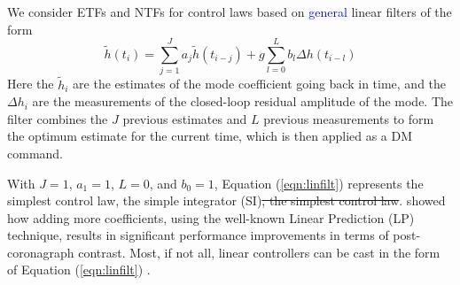 \documentclass[10pt,preprint]{aastex631}
\newcommand{\jrmadd}[1]{\textcolor{blue}{#1}}
\newcommand{\mpfadd}[1]{\textcolor{avocado}{#1}}
\newcommand{\mpfrmv}[1]{\textcolor{avocado}{\sout{#1}}}
\begin{document}
We consider ETFs and NTFs for control laws based on \jrmadd{general} linear filters of the form
\begin{equation}
\widetilde{h} (t_i) = \sum_{j=1}^J a_j \widetilde{h}(t_{i-j}) + g\sum_{l=0}^L b_l \Delta h (t_{i-l})  
\label{eqn:linfilt}
\end{equation}
Here the $\widetilde{h}_i$ are the estimates of the mode coefficient going back in time, and the $\Delta h_i$ are the measurements of the closed-loop residual amplitude of the mode.  The filter combines the $J$ previous estimates and $L$ previous measurements to form the optimum estimate for the current time, which is then applied as a DM command.  

With $J=1$, $a_1 = 1$, $L=0$, and $b_0 = 1$, Equation (\ref{eqn:linfilt}) represents the \mpfadd{simplest control law, the} simple integrator (SI)\mpfrmv{, the simplest control law}.  \citet{2018JATIS...4a9001M} showed how adding more coefficients, using the well-known Linear Prediction (LP) technique, results in significant performance improvements in terms of post-coronagraph contrast.  Most, if not all, linear controllers can be cast in the form of Equation (\ref{eqn:linfilt}) \citep{2007JOSAA..24.2645P, 2021arXiv210307566H}. 



% 
% 
% 
\end{document}
